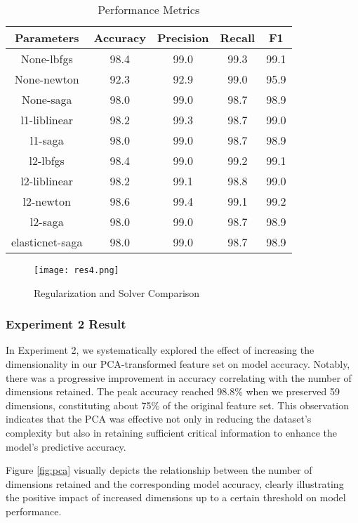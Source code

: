 \documentclass[a4paper,10pt,twocolumn]{article}
\begin{document}
\begin{table}[h!]
\caption{Performance Metrics}
\begin{center}
\begin{tabular}{|c|c|c|c|c|}
\hline
\textbf{Parameters} & \textbf{Accuracy} & \textbf{Precision} & \textbf{Recall} & \textbf{F1} \\ \hline
None-lbfgs & 98.4 & 99.0 & 99.3 & 99.1 \\
None-newton & 92.3 & 92.9 & 99.0 & 95.9 \\
None-saga & 98.0 & 99.0 & 98.7 & 98.9 \\
l1-liblinear & 98.2 & 99.3 & 98.7 & 99.0 \\
l1-saga & 98.0 & 99.0 & 98.7 & 98.9 \\
l2-lbfgs & 98.4 & 99.0 & 99.2 & 99.1 \\
l2-liblinear & 98.2 & 99.1 & 98.8 & 99.0 \\
l2-newton & 98.6 & 99.4 & 99.1 & 99.2 \\
l2-saga & 98.0 & 99.0 & 98.7 & 98.9 \\
elasticnet-saga & 98.0 & 99.0 & 98.7 & 98.9 \\
\hline
\end{tabular}
\end{center}
\label{ex1res}
\end{table}

\begin{figure}[h!t]
    \centering
    \texttt{[image: res4.png]}%
    \caption{Regularization and
Solver Comparison}
    \label{fig:regres}
\end{figure}

\subsubsection{Experiment 2 Result}
In Experiment 2, we systematically explored the effect of increasing the dimensionality in our PCA-transformed feature set on model accuracy. Notably, there was a progressive improvement in accuracy correlating with the number of dimensions retained. The peak accuracy reached 98.8\% when we preserved 59 dimensions, constituting about 75\% of the original feature set. This observation indicates that the PCA was effective not only in reducing the dataset's complexity but also in retaining sufficient critical information to enhance the model's predictive accuracy.

Figure \ref{fig:pca} visually depicts the relationship between the number of dimensions retained and the corresponding model accuracy, clearly illustrating the positive impact of increased dimensions up to a certain threshold on model performance.
\end{document}
